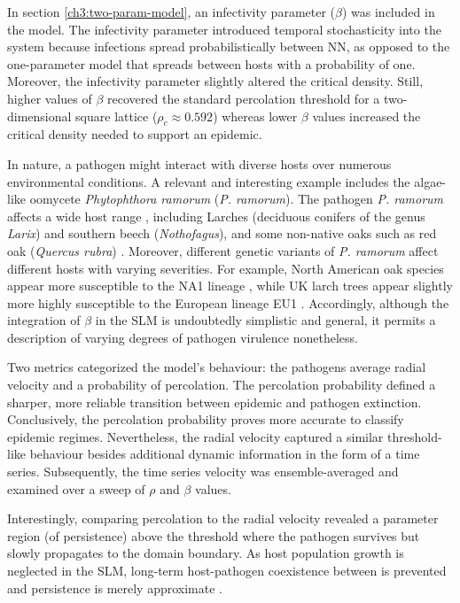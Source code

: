 In section \ref{ch3:two-param-model}, an infectivity parameter ($\beta$) was included in the model.
The infectivity parameter introduced temporal stochasticity into the system because infections spread probabilistically between NN, as opposed to the one-parameter model that spreads between hosts with a probability of one.
Moreover, the infectivity parameter slightly altered the critical density.
Still, higher values of $\beta$ recovered the standard percolation threshold for a two-dimensional square lattice ($\rho_c\approx 0.592$) whereas lower $\beta$ values increased the critical density needed to support an epidemic.

In nature, a pathogen might interact with diverse hosts over numerous environmental conditions.
A relevant and interesting example includes the algae-like oomycete \textit{Phytophthora ramorum} (\textit{P. ramorum}). 
The pathogen \textit{P. ramorum} affects a wide host range \cite{GRUNWALD2012131}, 
including Larches (deciduous conifers of the genus \textit{Larix}) and southern beech (\textit{Nothofagus}), 
and some non-native oaks such as red oak (\textit{Quercus rubra}) \cite{grunwald2008phytophthora}.
Moreover, different genetic variants of \textit{P. ramorum} affect different hosts with varying severities.
For example, North American oak species appear more susceptible to the NA1 lineage \cite{rizzo2002phytophthora},  while UK larch trees appear slightly more highly susceptible to the European lineage EU1 \cite{king2015planta}. Accordingly, although the integration of $\beta$ in the SLM is undoubtedly simplistic and general, it permits a description of varying degrees of pathogen virulence nonetheless.

Two metrics categorized the model's behaviour: the pathogens average radial velocity and a probability of percolation.
The percolation probability defined a sharper, more reliable transition between epidemic and pathogen extinction.
Conclusively, the percolation probability proves more accurate to classify epidemic regimes.
Nevertheless, the radial velocity captured a similar threshold-like behaviour besides additional dynamic information in the form of a time series.
Subsequently, the time series velocity was ensemble-averaged and examined over a sweep of $\rho$ and $\beta$ values. 

Interestingly, comparing percolation to the radial velocity revealed a parameter region (of persistence) above the threshold where the pathogen survives but slowly propagates to the domain boundary.
As host population growth is neglected in the SLM, long-term host-pathogen coexistence between is prevented and persistence is merely approximate \cite{gilligan2008epidemiological}. 

